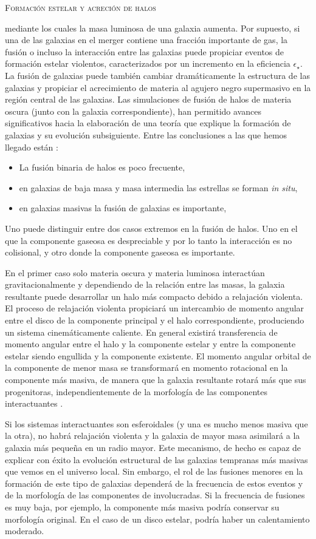 \documentclass[xcolor=dvipsnames,4pt,hyperref={colorlinks,citecolor=black,linkcolor=black,urlcolor=black}]{beamer}
\begin{document}
\begin{frame}[allowframebreaks]{\textsc{Formación estelar y acreción de halos}}
\begin{description}
mediante los cuales la masa luminosa de una galaxia aumenta. Por supuesto, si una de las galaxias en
el merger contiene una fracción importante de gas, la fusión o incluso la interacción entre las
galaxias puede propiciar eventos de formación estelar violentos, caracterizados por un incremento en
la eficiencia $\epsilon_\star$. La fusión de galaxias puede también cambiar dramáticamente la
estructura de las galaxias y propiciar el acrecimiento de materia al agujero negro supermasivo en la
región central de las galaxias. Las simulaciones de fusión de halos de materia oscura (junto con la
galaxia correspondiente), han permitido avances significativos hacia la elaboración de una teoría
que explique la formación de galaxias y su evolución subsiguiente. Entre las conclusiones a las que
hemos llegado están \citep{Naab2016}:
%
\begin{itemize}
\item La fusión binaria de halos es poco frecuente,
\item en galaxias de baja masa y masa intermedia las estrellas se forman \emph{in situ},
\item en galaxias masivas la fusión de galaxias es importante,
\end{itemize}
%
Uno puede distinguir entre dos casos extremos en la fusión de halos. Uno en el que la componente
gaseosa es despreciable y por lo tanto la interacción es no colisional, y otro donde la componente
gaseosa es importante.

En el primer caso solo materia oscura y materia luminosa interactúan gravitacionalmente y
dependiendo de la relación entre las masas, la galaxia resultante puede desarrollar un halo más
compacto debido a relajación violenta. El proceso de relajación violenta propiciará un intercambio
de momento angular entre el disco de la componente principal y el halo correspondiente, produciendo
un sistema cinemáticamente caliente. En general existirá transferencia de momento angular entre el
halo y la componente estelar y entre la componente estelar siendo engullida y la componente
existente. El momento angular orbital de la componente de menor masa se transformará en momento
rotacional en la componente más masiva, de manera que la galaxia resultante rotará más que sus
progenitoras, independientemente de la morfología de las componentes interactuantes \citep{Qu2017}.

Si los sistemas interactuantes son esferoidales (y una es mucho menos masiva que la otra), no habrá
relajación violenta y la galaxia de mayor masa asimilará a la galaxia más pequeña en un radio mayor.
Este mecanismo, de hecho es capaz de explicar con éxito la evolución estructural de las galaxias
tempranas más masivas que vemos en el universo local. Sin embargo, el rol de las fusiones menores en
la formación de este tipo de galaxias dependerá de la frecuencia de estos eventos y de la morfología
de las componentes de involucradas. Si la frecuencia de fusiones es muy baja, por ejemplo, la
componente más masiva podría conservar su morfología original. En el caso de un disco estelar,
podría haber un calentamiento moderado.


\end{description}
\end{frame}
\end{document}
